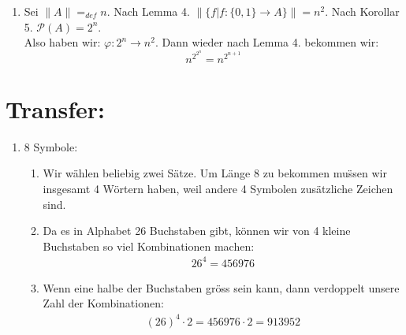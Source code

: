 \begin{enumerate}[label=(\alph*)]
		\item Sei $\|A\|=_{def} n$. Nach Lemma 4. $\|\{ f|f:\{0,1\} \to A \}\| = n^2$. 
		Nach Korollar 5. $\mathcal{P}(A) = 2^n$. \\ Also haben wir: $\varphi : 2^n \to n^2$. Dann wieder nach Lemma 4. bekommen wir: \[n^{2^{2^n}} = n^{2^{n+1}}\]
	\end{enumerate} 
	
	\section*{Transfer:}
	\begin{enumerate}[label=(\alph*)]
		\item 8 Symbole:
		\begin{enumerate}[label=\bfseries Schritt \arabic*:]
			\item Wir w\"ahlen beliebig zwei S\"atze. Um L\"ange 8 zu bekommen mu\"ssen wir insgesamt 4 W\"ortern haben,
			weil andere 4 Symbolen zus\"atzliche Zeichen sind.

			\item Da es in Alphabet 26 Buchstaben gibt, k\"onnen wir von 4 kleine Buchstaben so viel Kombinationen machen:
			\begin{align*}
				26^4=456976
			\end{align*}

			\item Wenn eine halbe der Buchstaben gr\"oss sein kann, dann verdoppelt unsere Zahl der Kombinationen:
			\begin{align*}
				(26)^4\cdot2=456976\cdot2=913952
			\end{align*}


\end{enumerate}
\end{enumerate}
